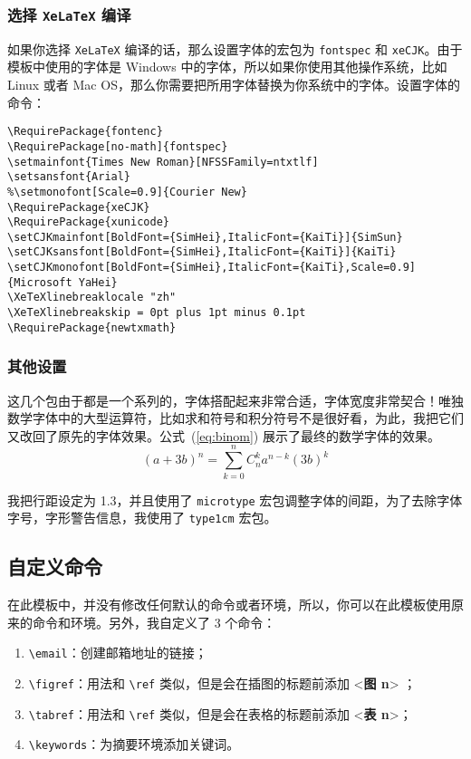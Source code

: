 \documentclass[lang=cn]{elegantpaper}
\begin{document}
\subsubsection[选择 XeLaTeX 编译]{选择 \lstinline{XeLaTeX} 编译}
如果你选择 \lstinline{XeLaTeX} 编译的话，那么设置字体的宏包为 \lstinline{fontspec} 和 \lstinline{xeCJK}。由于模板中使用的字体是 Windows 中的字体，所以如果你使用其他操作系统，比如 Linux 或者 Mac OS，那么你需要把所用字体替换为你系统中的字体。设置字体的命令：

\begin{lstlisting}
\RequirePackage{fontenc}
\RequirePackage[no-math]{fontspec}
\setmainfont{Times New Roman}[NFSSFamily=ntxtlf]
\setsansfont{Arial}
%\setmonofont[Scale=0.9]{Courier New}
\RequirePackage{xeCJK}
\RequirePackage{xunicode}
\setCJKmainfont[BoldFont={SimHei},ItalicFont={KaiTi}]{SimSun}
\setCJKsansfont[BoldFont={SimHei},ItalicFont={KaiTi}]{KaiTi}
\setCJKmonofont[BoldFont={SimHei},ItalicFont={KaiTi},Scale=0.9]{Microsoft YaHei}
\XeTeXlinebreaklocale "zh"
\XeTeXlinebreakskip = 0pt plus 1pt minus 0.1pt
\RequirePackage{newtxmath}
\end{lstlisting}

\subsubsection{其他设置}

这几个包由于都是一个系列的，字体搭配起来非常合适，字体宽度非常契合！唯独数学字体中的大型运算符，比如求和符号和积分符号不是很好看，为此，我把它们又改回了原先的字体效果。公式~(\ref{eq:binom}) 展示了最终的数学字体的效果。
\begin{equation}
(a+3b)^{n} = \sum_{k=0}^{n} C_{n}^{k} a^{n-k} (3b)^k \label{eq:binom}
\end{equation}

我把行距设定为 1.3，并且使用了 \lstinline{microtype} 宏包调整字体的间距，为了去除字体字号，字形警告信息，我使用了 \lstinline{type1cm} 宏包。


\subsection{自定义命令}
在此模板中，并没有修改任何默认的命令或者环境，所以，你可以在此模板使用原来的命令和环境。另外，我自定义了 3 个命令：

\begin{enumerate}
	\item \lstinline{\email}：创建邮箱地址的链接；
	\item \lstinline{\figref}：用法和 \lstinline{\ref} 类似，但是会在插图的标题前添加 <\textbf{图 n}> ；
	\item \lstinline{\tabref}：用法和 \lstinline{\ref} 类似，但是会在表格的标题前添加 <\textbf{表 n}>；
	\item \lstinline{\keywords}：为摘要环境添加关键词。
\end{enumerate}
\end{document}
